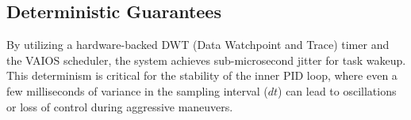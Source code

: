\subsection{Deterministic Guarantees}

By utilizing a hardware-backed DWT (Data Watchpoint and Trace) timer and the VAIOS scheduler, the system achieves sub-microsecond jitter for task wakeup. This determinism is critical for the stability of the inner PID loop, where even a few milliseconds of variance in the sampling interval (\( dt \)) can lead to oscillations or loss of control during aggressive maneuvers.
